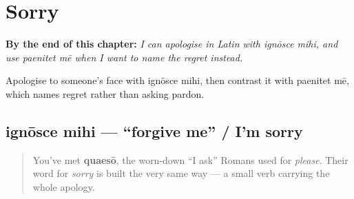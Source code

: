 
\chapter{Sorry}
\label{ch:la-sorry}

\begin{chapteropening}
\textbf{By the end of this chapter:} \emph{I can apologise in Latin with ignōsce mihi, and use paenitet mē when I want to name the regret instead.}

Apologise to someone's face with ignōsce mihi, then contrast it with paenitet mē, which names regret rather than asking pardon.
\end{chapteropening}

\section[ignōsce mihi]{ignōsce mihi — \textquotedblleft{}forgive me\textquotedblright{} / I'm sorry}

\label{lesson:LA-C04-ignosce-mihi}



\begin{quote}
You've met \textbf{quaesō}, the worn-down \textquotedblleft{}I ask\textquotedblright{} Romans used for \emph{please}. Their word for \emph{sorry} is built the very same way — a small verb carrying the whole apology.
\end{quote}

